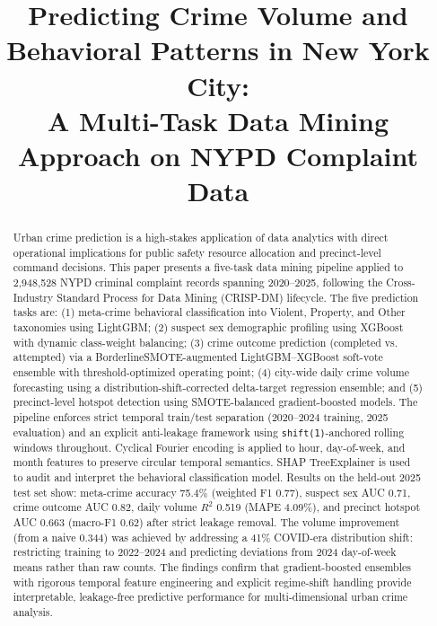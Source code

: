 \documentclass[conference]{IEEEtran}
\begin{document}
\title{Predicting Crime Volume and Behavioral Patterns in New York City:\\
A Multi-Task Data Mining Approach on NYPD Complaint Data}

\author{
}

\maketitle

\begin{abstract}
Urban crime prediction is a high-stakes application of data analytics with direct operational implications for public safety resource allocation and precinct-level command decisions. This paper presents a five-task data mining pipeline applied to 2,948,528 NYPD criminal complaint records spanning 2020--2025, following the Cross-Industry Standard Process for Data Mining (CRISP-DM) lifecycle. The five prediction tasks are: (1) meta-crime behavioral classification into Violent, Property, and Other taxonomies using LightGBM; (2) suspect sex demographic profiling using XGBoost with dynamic class-weight balancing; (3) crime outcome prediction (completed vs. attempted) via a BorderlineSMOTE-augmented LightGBM--XGBoost soft-vote ensemble with threshold-optimized operating point; (4) city-wide daily crime volume forecasting using a distribution-shift-corrected delta-target regression ensemble; and (5) precinct-level hotspot detection using SMOTE-balanced gradient-boosted models. The pipeline enforces strict temporal train/test separation (2020--2024 training, 2025 evaluation) and an explicit anti-leakage framework using \texttt{shift(1)}-anchored rolling windows throughout. Cyclical Fourier encoding is applied to hour, day-of-week, and month features to preserve circular temporal semantics. SHAP TreeExplainer is used to audit and interpret the behavioral classification model. Results on the held-out 2025 test set show: meta-crime accuracy 75.4\% (weighted F1 0.77), suspect sex AUC 0.71, crime outcome AUC 0.82, daily volume $R^2$ 0.519 (MAPE 4.09\%), and precinct hotspot AUC 0.663 (macro-F1 0.62) after strict leakage removal. The volume improvement (from a naive 0.344) was achieved by addressing a 41\% COVID-era distribution shift: restricting training to 2022--2024 and predicting deviations from 2024 day-of-week means rather than raw counts. The findings confirm that gradient-boosted ensembles with rigorous temporal feature engineering and explicit regime-shift handling provide interpretable, leakage-free predictive performance for multi-dimensional urban crime analysis.
\end{abstract}
\end{document}
